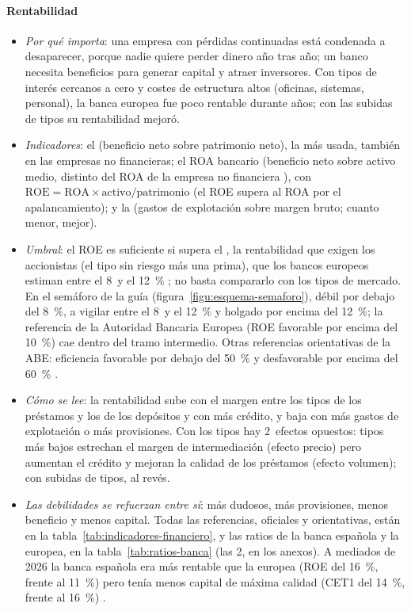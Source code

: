 \documentclass[11pt]{article}
\begin{document}
\paragraph{Rentabilidad}
\begin{itemize}
\item \emph{Por qué importa}: una empresa con pérdidas continuadas está condenada a desaparecer, porque nadie quiere perder dinero año tras año; un banco necesita beneficios para generar capital y atraer inversores. Con tipos de interés cercanos a cero y costes de estructura altos (oficinas, sistemas, personal), la banca europea fue poco rentable durante años; con las subidas de tipos su rentabilidad mejoró.
\item \emph{Indicadores}: el  (beneficio neto sobre patrimonio neto), la más usada, también en las empresas no financieras; el ROA bancario (beneficio neto sobre activo medio, distinto del ROA de la empresa no financiera ), con $\mathrm{ROE}=\mathrm{ROA}\times\text{activo}/\text{patrimonio}$ (el ROE supera al ROA por el apalancamiento); y la  (gastos de explotación sobre margen bruto; cuanto menor, mejor).
\item \emph{Umbral}: el ROE es suficiente si supera el , la rentabilidad que exigen los accionistas (el tipo sin riesgo más una prima), que los bancos europeos estiman entre el 8~y el 12~\% \parencite{ABE2025RAR}; no basta compararlo con los tipos de mercado. En el semáforo de la guía (figura~\ref{figu:esquema-semaforo}), débil por debajo del 8~\%, a vigilar entre el 8~y el 12~\% y holgado por encima del 12~\%; la referencia de la Autoridad Bancaria Europea (ROE favorable por encima del 10~\%) cae dentro del tramo intermedio. Otras referencias orientativas de la ABE: eficiencia favorable por debajo del 50~\% y desfavorable por encima del 60~\% \parencite{ABE2026RiskDashboard}.
\item \emph{Cómo se lee}: la rentabilidad sube con el margen entre los tipos de los préstamos y los de los depósitos y con más crédito, y baja con más gastos de explotación o más provisiones. Con los tipos hay 2~efectos opuestos: tipos más bajos estrechan el margen de intermediación (efecto precio) pero aumentan el crédito y mejoran la calidad de los préstamos (efecto volumen); con subidas de tipos, al revés.
\item \emph{Las debilidades se refuerzan entre sí}: más dudosos, más provisiones, menos beneficio y menos capital. Todas las referencias, oficiales y orientativas, están en la tabla~\ref{tab:indicadores-financiero}, y las ratios de la banca española y la europea, en la tabla~\ref{tab:ratios-banca} (las 2, en los anexos). A mediados de 2026 la banca española era más rentable que la europea (ROE del 16~\%, frente al 11~\%) pero tenía menos capital de máxima calidad (CET1 del 14~\%, frente al 16~\%) \parencite{BdE2026EstadSupervisoras,ABE2026RiskDashboard}.

\end{itemize}
\end{document}
